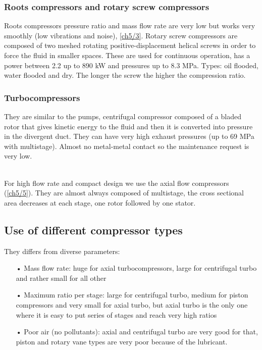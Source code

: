 \subsubsection{Roots compressors and rotary screw compressors} 

Roots compressors pressure ratio and mass flow rate are very low but works very smoothly (low vibrations and noise), \autoref{ch5/3}. Rotary screw compressors are composed of two meshed rotating positive-displacement helical screws in order to force the fluid in smaller spaces. These are used for continuous operation, has a power between 2.2 up to 890 kW and pressures up to 8.3 MPa. Types: oil flooded, water flooded and dry. The longer the screw the higher the compression ratio. 

\subsubsection{Turbocompressors}
They are similar to the pumps, centrifugal compressor composed of a bladed rotor that gives kinetic energy to the fluid and then it is converted into pressure in the divergent duct. They can have very high exhaust pressures (up to 69 MPa with multistage). Almost no metal-metal contact so the maintenance request is very low. 

\ \\
For high flow rate and compact design we use the axial flow compressors (\autoref{ch5/5}). They are almost always composed of multistage, the cross sectional area decreases at each stage, one rotor followed by one stator. 

\subsection{Use of different compressor types}
They differs from diverse parameters: 

\begin{itemize}
\item[•] Mass flow rate: huge for axial turbocompressors, large for centrifugal turbo and rather small for all other \\
\item[•] Maximum ratio per stage: large for centrifugal turbo, medium for piston compressors and very small for axial turbo, but axial turbo is the only one where it is easy to put series of stages and reach very high ratios
\item[•] Poor air (no pollutants): axial and centrifugal turbo are very good for that, piston and rotary vane types are very poor because of the lubricant. 
\end{itemize}

